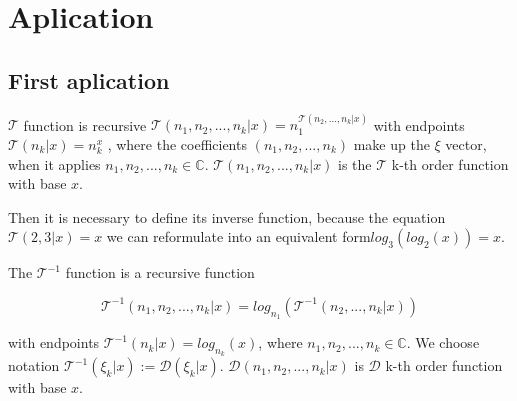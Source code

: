 \section{Aplication}

\subsection{First aplication}

\begin{definition}
      \(\mathcal{T}\) function is recursive \(\mathcal{T}(n_1, n_2,
      ..., n_k | x) = n_1^{\mathcal{T}(n_2, ..., n_k | x)}\) with
      endpoints \(\mathcal{T}(n_k | x ) = n_k^x\) , 
      where the coefficients  \((n_1, n_2, ..., n_k)\) make up the 
      \(\xi\) vector,
      when it applies \(n_1, n_2, ..., n_k \in  \mathbb{C}\). 
      \(\mathcal{T}(n_1, n_2, ..., n_k | x) \) is the \(\mathcal{T}\)
      k-th order function with base \(x\).
\end{definition}

Then it is necessary to define its inverse function, because 
the equation \(\mathcal{T}(2, 3 | x) = x\) we can reformulate
into an equivalent form\(log_3(log_2(x)) = x\).

\begin{definition}
      The \(\mathcal{T}^{-1}\) function is a recursive function
      
      \begin{equation}
            \mathcal{T}^{-1}(n_1, n_2, ..., n_k | x) = 
            log_{n_1}({\mathcal{T}^{-1}(n_2, ..., n_k | x)})
      \label{3}
      \end{equation}
      
      with endpoints \(\mathcal{T}^{-1}(n_k | x ) = log_{n_k}(x)\), 
      where \(n_1, n_2, ..., n_k \in  \mathbb{C}\). We choose notation
      \(\mathcal{T}^{-1}(\xi_k | x) := \mathcal{D}(\xi_k | x)\). 
      \(\mathcal{D}(n_1, n_2, ..., n_k | x) \) is \(\mathcal{D}\)
      k-th order function with base \(x\).
\end{definition}


